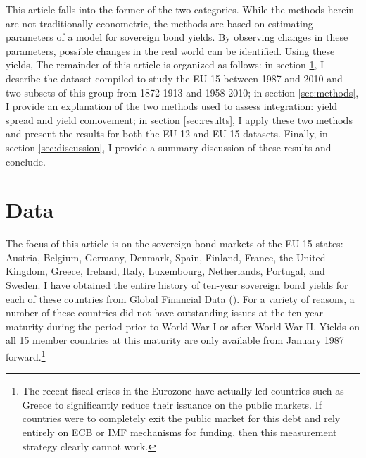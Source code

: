 \documentclass[3p]{elsarticle}
\begin{document}
This article falls into the former of the two categories.  While the methods herein are not traditionally econometric, the methods are based on estimating parameters of a model for sovereign bond yields.  By observing changes in these parameters, possible changes in the real world can be identified.  Using these yields, The remainder of this article is organized as follows: in section \ref{sec:data}, I describe the dataset compiled to study the EU-15 between 1987 and 2010 and two subsets of this group from 1872-1913 and 1958-2010; in section \ref{sec:methods}, I provide an explanation of the two methods used to assess integration: yield spread and yield comovement; in section \ref{sec:results}, I apply these two methods and present the results for both the EU-12 and EU-15 datasets.  Finally, in section \ref{sec:discussion}, I provide a summary discussion of these results and conclude.

\section{Data}
\label{sec:data}
The focus of this article is on the sovereign bond markets of the EU-15 states: Austria, Belgium, Germany, Denmark, Spain, Finland, France, the United Kingdom, Greece, Ireland, Italy, Luxembourg, Netherlands, Portugal, and Sweden.  I have obtained the entire history of ten-year sovereign bond yields for each of these countries from Global Financial Data (\cite{GFD2010}).  For a variety of reasons, a number of these countries did not have outstanding issues at the ten-year maturity during the period prior to World War I or after World War II.  Yields on all 15 member countries at this maturity are only available from January 1987 forward.\footnote{The recent fiscal crises in the Eurozone have actually led countries such as Greece to significantly reduce their issuance on the public markets.  If countries were to completely exit the public market for this debt and rely entirely on ECB or IMF mechanisms for funding, then this measurement strategy clearly cannot work.}
\end{document}
